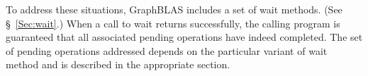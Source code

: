 To address these situations, GraphBLAS includes a set of {\sf wait} methods. (See \S~\ref{Sec:wait}.)
When a call to {\sf wait} returns successfully, the calling program is guaranteed that all associated
pending operations have indeed completed. The set of pending operations addressed depends on the
particular variant of {\sf wait} method and is described in the appropriate section.

